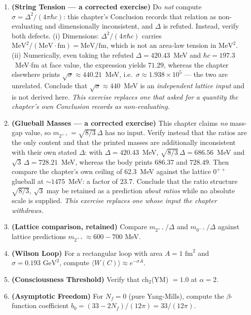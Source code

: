 \begin{enumerate}
\item \textbf{(String Tension --- a corrected exercise)} Do \emph{not}
compute $\sigma = \Delta^2/(4\pi\hbar c)$: this chapter's Conclusion records
that relation as non-evaluating and dimensionally inconsistent, and $\Delta$ is
refuted. Instead, verify both defects. (i) Dimensions: $\Delta^2/(4\pi\hbar c)$
carries $\mathrm{MeV}^2/(\mathrm{MeV}\!\cdot\!\mathrm{fm}) =
\mathrm{MeV}/\mathrm{fm}$, which is not an area-law tension in
$\mathrm{MeV}^2$. (ii) Numerically, even taking the refuted
$\Delta = 420.43$~MeV and $\hbar c = 197.3$~MeV$\cdot$fm at face value, the
expression yields $71.29$, whereas the chapter elsewhere prints
$\sqrt{\sigma} \approx 440.21$~MeV, i.e.\ $\sigma \approx 1.938\times10^{5}$ ---
the two are unrelated. Conclude that $\sqrt{\sigma}\approx 440$~MeV is an
\emph{independent lattice input} and is not derived here.
\emph{This exercise replaces one that asked for a quantity the chapter's own
Conclusion records as non-evaluating.}

\item \textbf{(Glueball Masses --- a corrected exercise)} This chapter
claims \emph{no} mass-gap value, so $m_{2^{++}} = \sqrt{8/3}\,\Delta$ has no
input. Verify instead that the ratios are the only content and that the printed
masses are additionally inconsistent with their own stated $\Delta$: with
$\Delta = 420.43$~MeV, $\sqrt{8/3}\,\Delta = 686.56$~MeV and
$\sqrt{3}\,\Delta = 728.21$~MeV, whereas the body prints $686.37$ and
$728.49$. Then compare the chapter's own ceiling of $62.3$~MeV against the
lattice $0^{++}$ glueball at ${\sim}1475$~MeV: a factor of $23.7$. Conclude
that the ratio structure $\sqrt{8/3}$, $\sqrt{3}$ may be retained as a
prediction \emph{about ratios} while no absolute scale is supplied.
\emph{This exercise replaces one whose input the chapter withdraws.}
\item \textbf{(Lattice comparison, retained)} Compare $m_{2^{++}}/\Delta$ and
$m_{0^{-+}}/\Delta$ against lattice predictions $m_{2^{++}} \approx 600-700$ MeV.

\item \textbf{(Wilson Loop)} For a rectangular loop with area $A = 1 \text{ fm}^2$ and $\sigma = 0.193 \text{ GeV}^2$, compute $\langle W(C) \rangle \approx e^{-\sigma A}$.

\item \textbf{(Consciousness Threshold)} Verify that ch$_2$(YM) $= 1.0$ at $\alpha = 2$.

\item \textbf{(Asymptotic Freedom)} For $N_f = 0$ (pure Yang-Mills), compute the $\beta$-function coefficient $b_0 = (33 - 2N_f)/(12\pi) = 33/(12\pi)$.
\end{enumerate}

